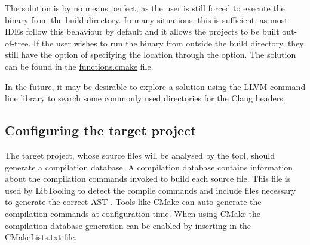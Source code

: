 The solution is by no means perfect, as the user is still forced to execute the binary from the build directory. In many situations, this is sufficient, as most IDEs follow this behaviour by default and it allows the projects to be built out-of-tree. If the user wishes to run the binary from outside the build directory, they still have the option of specifying the location through the  option. The solution can be found in the \href{https://github.com/mortenhaahr/RD/blob/main/examples/c_style_array_converter/cmake/functions.cmake}{functions.cmake} file.

In the future, it may be desirable to explore a solution using the LLVM command line library to search some commonly used directories for the Clang headers.

\subsection{Configuring the target project}

The target project, whose source files will be analysed by the tool, should generate a compilation database. A compilation database contains information about the compilation commands invoked to build each source file. This file is used by LibTooling to detect the compile commands and include files necessary to generate the correct AST \cite{clangJSONCompilationDatabase}. Tools like CMake can auto-generate the compilation commands at configuration time. When using CMake the compilation database generation can be enabled by inserting  in the CMakeLists.txt file.